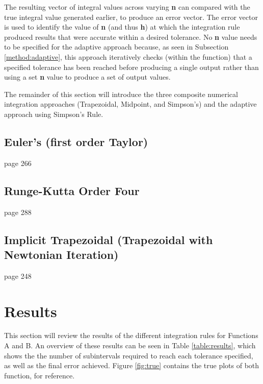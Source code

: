 \documentclass{article}
\begin{document}
The resulting vector of integral values across varying \textbf{n} can compared with the true integral value generated earlier, to produce an error vector. The error vector is used to identify the value of \textbf{n} (and thus \textbf{h}) at which the integration rule produced results that were accurate within a desired tolerance. No \textbf{n} value needs to be specified for the adaptive approach because, as seen in Subsection \ref{method:adaptive}, this approach iteratively checks (within the function) that a specified tolerance has been reached before producing a single output rather than using a set \textbf{n} value to produce a set of output values.


The remainder of this section will introduce the three composite numerical integration approaches (Trapezoidal, Midpoint, and Simpson's) and the adaptive approach using Simpson's Rule.


\subsection{Euler's (first order Taylor)}
\label{method:euler}

page 266



\subsection{Runge-Kutta Order Four}
\label{method:rk}

page 288



\subsection{Implicit Trapezoidal (Trapezoidal with Newtonian Iteration)}
\label{method:implicit}

page 248



\newpage
\section{Results}
\label{sec:results}

This section will review the results of the different integration rules for Functions A and B. An overview of these results can be seen in Table \ref{table:results}, which shows the the number of subintervals required to reach each tolerance specified, as well as the final error achieved. Figure \ref{fig:true} contains the true plots of both function, for reference.
\end{document}
